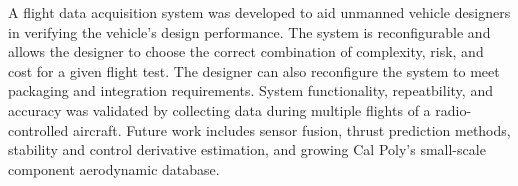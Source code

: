 A flight data acquisition system was developed to aid unmanned vehicle designers in verifying the vehicle's design performance. The system is reconfigurable and allows the designer to choose the correct combination of complexity, risk, and cost for a given flight test. The designer can also reconfigure the system to meet packaging and integration requirements. System functionality, repeatbility, and accuracy was validated by collecting data during multiple flights of a radio-controlled aircraft. Future work includes sensor fusion, thrust prediction methods, stability and control derivative estimation, and growing Cal Poly's small-scale component aerodynamic database.
